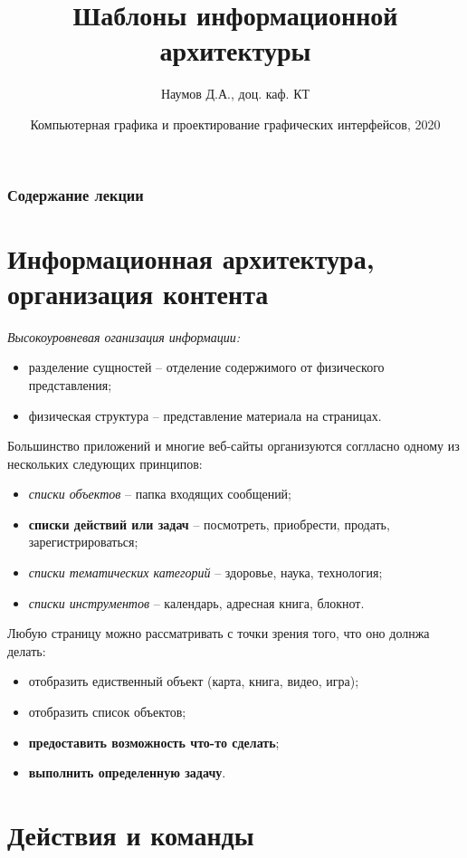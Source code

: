 \documentclass{beamer}
\title[Шаблоны]{Шаблоны информационной архитектуры}
\author{Наумов Д.А., доц. каф. КТ}
\date[18.11.2020] {Компьютерная графика и проектирование графических интерфейсов, 2020}
\begin{document}
\begin{frame}
  \titlepage
\end{frame}
  
\begin{frame}
  \frametitle{Содержание лекции}
  \tableofcontents  
\end{frame}

\section{Информационная архитектура, организация контента}

\begin{frame}[t]
	\textit{Высокоуровневая оганизация информации:}
	\begin{itemize}
		\item разделение сущностей -- отделение содержимого от физического представления;
		\item физическая структура -- представление материала на страницах.
	\end{itemize}
	
	Большинство приложений и многие веб-сайты организуются соглласно одному из нескольких следующих принципов:
	\begin{itemize}
		\item \textit{списки объектов} -- папка входящих сообщений;
		\item \textbf{списки действий или задач} -- посмотреть, приобрести, продать, зарегистрироваться; 		
		\item \textit{списки тематических категорий} -- здоровье, наука, технология;		
		\item \textit{списки инструментов} -- календарь, адресная книга, блокнот.		
	\end{itemize}
	
	Любую страницу можно рассматривать с точки зрения того, что оно долнжа делать:
	\begin{itemize}
		\item отобразить едиственный объект (карта, книга, видео, игра);
		\item отобразить список объектов;
		\item \textbf{предоставить возможность что-то сделать};
		\item \textbf{выполнить определенную задачу}.				
	\end{itemize}
\end{frame} 

\section{Действия и команды}
\end{document}
